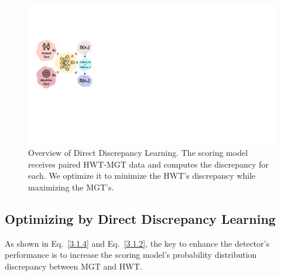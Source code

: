 
\begin{figure}[t]
    \centering
    \includegraphics[width=0.65\linewidth]{fig/ddl.pdf}
    \caption{Overview of Direct Discrepancy Learning. The scoring model receives paired HWT-MGT data and computes the discrepancy for each. We optimize it to minimize the HWT's discrepancy while maximizing the MGT's.}
    \label{fig:ddl}
\end{figure}

\subsection{Optimizing by Direct Discrepancy Learning}\label{3.2}
As shown in Eq.~\eqref{3.1.4} and Eq.~\eqref{3.1.2}, the key to enhance the detector's performance is to increase the scoring model's probability distribution discrepancy between MGT and HWT.

